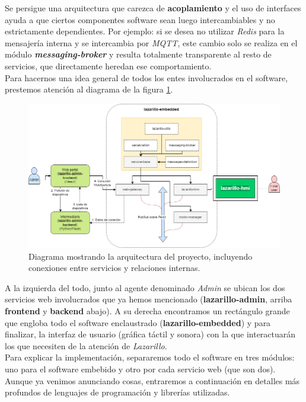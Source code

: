 Se persigue una arquitectura que carezca de \textbf{acoplamiento} y el uso de interfaces ayuda a que ciertos componentes software sean luego intercambiables y no estrictamente dependientes. Por ejemplo: si se desea no utilizar \textit{Redis} para la mensajería interna y se intercambia por \textit{MQTT}, este cambio solo se realiza en el módulo \textbf{\textit{messaging-broker}} y resulta totalmente transparente al resto de servicios, que directamente heredan ese comportamiento.\\

Para hacernos una idea general de todos los entes involucrados en el software, prestemos atención al diagrama de la figura \ref{lazarillo-architecture}.\\

\begin{figure}[h]
	\centering
	\includegraphics[width=\textwidth]{imagenes/lazarillo-architecture.png}
	\caption{Diagrama mostrando la arquitectura del proyecto, incluyendo conexiones entre servicios y relaciones internas.}
	\label{lazarillo-architecture}
\end{figure}

A la izquierda del todo, junto al agente denominado \textit{Admin} se ubican los dos servicios web involucrados que ya hemos mencionado (\textbf{lazarillo-admin}, arriba \textbf{frontend} y \textbf{backend} abajo). A su derecha encontramos un rectángulo grande que engloba todo el software enclaustrado (\textbf{lazarillo-embedded}) y para finalizar, la interfaz de usuario (gráfica táctil y sonora) con la que interactuarán los que necesiten de la atención de \textit{Lazarillo}.\\

Para explicar la implementación, separaremos todo el software en tres módulos: uno para el software embebido y otro por cada servicio web (que son dos). Aunque ya venimos anunciando cosas, entraremos a continuación en detalles más profundos de lenguajes de programación y librerías utilizadas.\\


